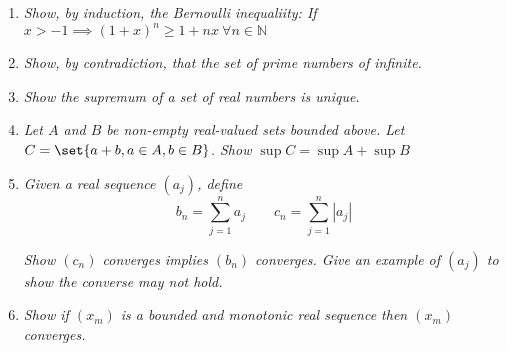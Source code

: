 \documentclass{article}
\begin{document}
\displayoptions

\section{}

\begin{enumerate}[1.]
  \item \textit{Show, by induction, the Bernoulli inequaliity: If $x > -1 \implies (1 + x)^n \ge 1 + nx ~ \forall n \in \mathbb{N}$}

  \item \textit{Show, by contradiction, that the set of prime numbers of infinite.}

  \item \textit{Show the supremum of a set of real numbers is unique.}

  \item \textit{Let $A$ and $B$ be non-empty real-valued sets bounded above. Let $C = \set{a +b, a \in A, b \in B}$. Show $\sup C = \sup A + \sup B$}

  \item \textit{Given a real sequence $(a_j)$, define}
    \[
        b_n = \sum^{n}_{j = 1} a_j
        \quad\quad
        c_n = \sum^{n}_{j = 1} |a_j|
    \]

    \textit{Show $(c_n)$ converges implies $(b_n)$ converges. Give an example of $(a_j)$ to show the converse may not hold.}

  \item \textit{Show if $(x_m)$ is a bounded and monotonic real sequence then $(x_m)$ converges.}
\end{enumerate}

\end{document}
